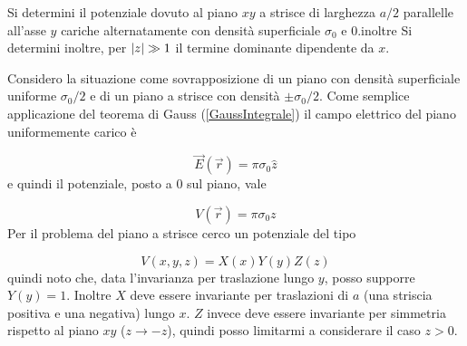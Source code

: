 \documentclass[../main.tex]{subfiles}
\begin{document}

\textex

Si determini il potenziale dovuto al piano $xy$ a strisce di larghezza $a/2$ parallelle all'asse $y$ cariche alternatamente con densità superficiale $\sigma_0$  e $0$.\newline inoltre
Si determini inoltre, per $\lvert z\rvert \gg 1$ il termine dominante dipendente da $x$.

\solution
Considero la situazione come sovrapposizione di un piano con densità superficiale uniforme $\sigma_0/2$ e di un piano a strisce con densità $\pm \sigma_0/2$.
Come semplice applicazione del teorema di Gauss (\cref{GaussIntegrale}) il campo elettrico del piano uniformemente carico è

\begin{equation*}
  \vec E (\vec r)= \pi \sigma_0 \hat z 
\end{equation*}
e quindi il potenziale, posto a $0$ sul piano, vale

\begin{equation}
  \label{pz:potenzialeuniforme}
  V(\vec r)= \pi \sigma_0 z
\end{equation}
Per il problema del piano a strisce cerco un potenziale del tipo

\begin{equation*}
  V(x, y, z)=X(x)Y(y)Z(z)
\end{equation*}
quindi noto che, data l'invarianza per traslazione lungo $y$, posso supporre $Y(y)=1$.
Inoltre $X$ deve essere invariante per traslazioni di $a$ (una striscia positiva e una negativa) lungo $x$.
$Z$ invece deve essere invariante per simmetria rispetto al piano $xy$ ($z \to -z$), quindi posso limitarmi a considerare il caso $z > 0$.
\end{document}
